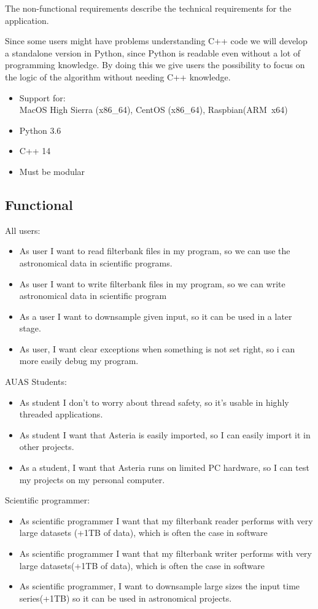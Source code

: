 \documentclass[a4paper,11pt]{report}
\begin{document}
    The non-functional requirements describe the technical requirements for the application.
    
    Since some users might have problems understanding C++ code we will develop a standalone version in Python, since Python is readable even without a lot of programming knowledge.
	By doing this we give users the possibility to focus on the logic of the algorithm without needing C++ knowledge.
    
    \begin{itemize}
        \item Support for:\\ MacOS High Sierra (x86\_64), CentOS (x86\_64), Raspbian(ARM\ x64)
        \item Python 3.6
        \item C++ 14
        \item Must be modular
    \end{itemize}
    
    \subsection{Functional}

    All users:
	\begin{itemize}
        \item As user I want to read filterbank files in my program, so we can use the astronomical data in scientific programs.
        \item As user I want to write filterbank files in my program, so we can write astronomical data in scientific program
		\item As a user I want to downsample given input, so it can be used in a later stage.
		\item As user, I want clear exceptions when something is not set right, so i can more easily debug my program.
	\end{itemize}
	AUAS Students:
	\begin{itemize}
		\item As student I don't to worry about thread safety, so it's usable in highly threaded applications.
		\item As student I want that Asteria is easily imported, so I can easily import it in other projects.
		\item As a student, I want that Asteria runs on limited PC hardware, so I can test my projects on my personal computer.
    \end{itemize}
	Scientific programmer:
	\begin{itemize}
        \item As scientific programmer I want that my filterbank reader performs with very large datasets (+1TB of data), which is often the case in software
        \item As scientific programmer I want that my filterbank writer performs with very large datasets(+1TB of data), which is often the case in software
		\item As scientific programmer, I want to downsample large sizes the input time series(+1TB) so it can be used in astronomical projects.
    \end{itemize}    

    
\end{document}

